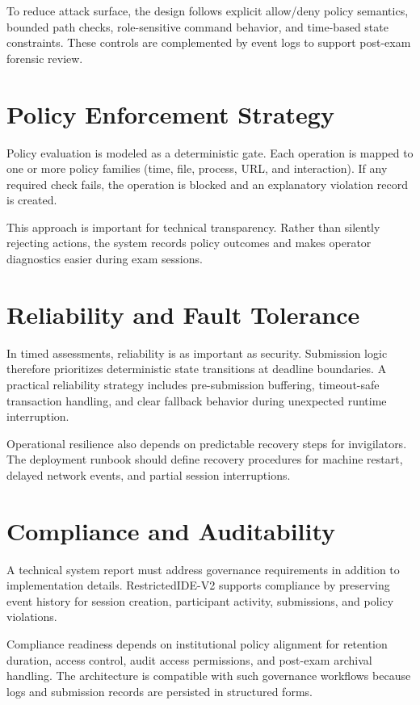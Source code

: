 \documentclass[12pt,a4paper]{report}
\begin{document}
	To reduce attack surface, the design follows explicit allow/deny policy semantics, bounded path checks, role-sensitive command behavior, and time-based state constraints. These controls are complemented by event logs to support post-exam forensic review.
	
	\section{Policy Enforcement Strategy}
	Policy evaluation is modeled as a deterministic gate. Each operation is mapped to one or more policy families (time, file, process, URL, and interaction). If any required check fails, the operation is blocked and an explanatory violation record is created.
	
	This approach is important for technical transparency. Rather than silently rejecting actions, the system records policy outcomes and makes operator diagnostics easier during exam sessions.
	
	\section{Reliability and Fault Tolerance}
	In timed assessments, reliability is as important as security. Submission logic therefore prioritizes deterministic state transitions at deadline boundaries. A practical reliability strategy includes pre-submission buffering, timeout-safe transaction handling, and clear fallback behavior during unexpected runtime interruption.
	
	Operational resilience also depends on predictable recovery steps for invigilators. The deployment runbook should define recovery procedures for machine restart, delayed network events, and partial session interruptions.
	
	\section{Compliance and Auditability}
	A technical system report must address governance requirements in addition to implementation details. RestrictedIDE-V2 supports compliance by preserving event history for session creation, participant activity, submissions, and policy violations.
	
	Compliance readiness depends on institutional policy alignment for retention duration, access control, audit access permissions, and post-exam archival handling. The architecture is compatible with such governance workflows because logs and submission records are persisted in structured forms.
	
\end{document}
